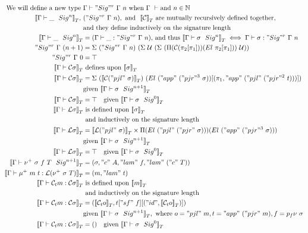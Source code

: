 \begin{align*}
  \text{We will define a new type }& \goodType{\Gamma}{\Sigr{\Gamma}{n}}{} \text{ when } \goodCtx{\Gamma}{} \text{ and } n \in \mathbb{N} \\
  \denotesT{\goodSig{\Gamma}{\_}{n}},\ &({\Sigr{\Gamma}{n}}), \text{ and } \ \denotesT{\cC} \text{ are mutually recursively defined together, } \\
  & \text{and they define inductively on the signature length} \\  
  \denotesT{\goodSig{\Gamma}{\_}{n}} &= (\goodTerm{\Gamma}{\_}{\Sigr{\Gamma}{n}}) \text{, and thus } \denotesT{\goodSig{\Gamma}{\sigma}{n}} \iff \goodTerm{\Gamma}{\sigma}{\Sigr{\Gamma}{n}} \\ 
  {\Sigr{\Gamma}{(n+1)}} &= 
    \Sigma~(\Sigr{\Gamma}{n})
          ~(\Sigma~\cU
                  ~(\Sigma~(\Pi(\cC (\pi_2[\pi_1]))(El~\pi_2[\pi_1]))~\cU)) \\
  \Sigr{\Gamma}{0} &= \top \\
  \denotesT{\goodType{\Gamma}{\cC \sigma}{}} &\text{ defines upon } \denotesT{\sigma} \\
  \denotesT{\goodType{\Gamma}{\cC \sigma}{}} &= 
    \Sigma~(\denotesT{\cC ("pjl"~\sigma)})~(El \ ("app"~("pjr"^3~\sigma))[(\pi_1, "app"~("pjl"~("pjr"^2~t)))]) \\
      &\text{given } \denotesT{\goodSig{\Gamma}{\sigma}{n+1}} \\
  \denotesT{\goodType{\Gamma}{\cC \sigma}{}} &= \top \quad
      \text{given } \denotesT{\goodSig{\Gamma}{\sigma}{0}} \\ 
  \denotesT{\goodType{\Gamma}{\cL\sigma}{}} & \text{ is defined upon } \denotesT{\sigma} \\
  & \text{ and inductively on the signature length} \\ 
  \denotesT{\goodType{\Gamma}{\cL\sigma}{}} &=
  \denotesT{\cL("pjl"~\sigma)} \times \Pi(El~("pjl"~("pjr"~\sigma)))(El~("app"~("pjr"^3~\sigma))) \\
  &\text{given } \denotesT{\goodSig{\Gamma}{\sigma}{n+1}} \\
  \denotesT{\goodType{\Gamma}{\cL\sigma}{}} &= \top \quad \text{given } \denotesT{\goodSig{\Gamma}{\sigma}{0}} \\
  \denotesT{\goodSig{\Gamma}{\nu^+~\sigma~f~T}{n+1}} &= (\sigma, "c"~A, "lam"~f, "lam"~("c"~T)) \\ 
  \denotesT{\goodTerm{\Gamma}{\mu^+~m~t}{\cL(\nu^+~\sigma~T)}} &= (m, "lam"~t) \\ 
  \denotesT{\goodTerm{\Gamma}{\cCt m}{\cC\sigma}} & \text{ is defined upon } \denotesT{m}\\
  & \text{ and inductively on the signature length} \\ 
  \denotesT{\goodTerm{\Gamma}{\cCt m}{\cC\sigma}} &= 
  (\denotesT{\cCt o}, t["sf"~f][("id", \denotesT{\cCt o})]) \\
  & \text{given } \denotesT{\goodSig{\Gamma}{\sigma}{n+1}}, \text{ where } o = "pjl"~m, t = "app"~("pjr"~m), f = p_f\nu~\sigma \\ 
  \denotesT{\goodTerm{\Gamma}{\cCt m}{\cC \sigma}} &= () \quad \text{given } \denotesT{\goodSig{\Gamma}{\sigma}{0}}
\end{align*}
